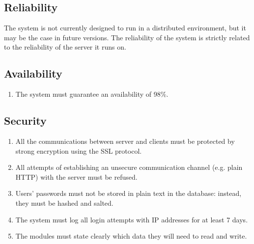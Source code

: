 \subsection{Reliability}

The system is not currently designed to run in a distributed environment, but it may be the case in future versions.
The reliability of the system is strictly related to the reliability of the server it runs on.

\subsection{Availability}
\begin{enumerate}
\item The system must guarantee an availability of 98\%.
\end{enumerate}

\subsection{Security}

\begin{enumerate}
\item All the communications between server and clients must be protected by strong encryption using the SSL protocol.
\item All attempts of establishing an unsecure communication channel (e.g. plain HTTP) with the server must be refused.
\item Users' passwords must not be stored in plain text in the database: instead, they must be hashed and salted.
\item The system must log all login attempts with IP addresses for at least 7 days.
\item The modules must state clearly which data they will need to read and write.
\end{enumerate}

